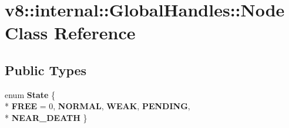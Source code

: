 \hypertarget{classv8_1_1internal_1_1_global_handles_1_1_node}{}\section{v8\+:\+:internal\+:\+:Global\+Handles\+:\+:Node Class Reference}
\label{classv8_1_1internal_1_1_global_handles_1_1_node}
\subsection*{Public Types}
\begin{DoxyCompactItemize}
\item 
\hypertarget{classv8_1_1internal_1_1_global_handles_1_1_node_ad0e78c1f3196c693801bcac55e643acb}{}enum {\bfseries State} \{ \\*
{\bfseries F\+R\+E\+E} = 0, 
{\bfseries N\+O\+R\+M\+A\+L}, 
{\bfseries W\+E\+A\+K}, 
{\bfseries P\+E\+N\+D\+I\+N\+G}, 
\\*
{\bfseries N\+E\+A\+R\+\_\+\+D\+E\+A\+T\+H}
 \}\label{classv8_1_1internal_1_1_global_handles_1_1_node_ad0e78c1f3196c693801bcac55e643acb}

\end{DoxyCompactItemize}
